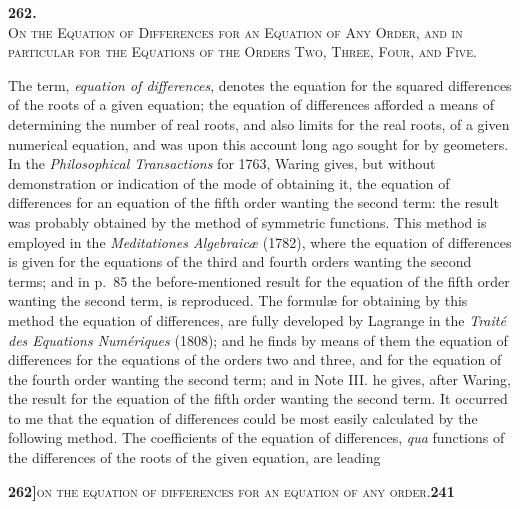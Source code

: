 \documentclass[11pt]{article}
\begin{document}
\vspace{2cm}
\begin{center}
{\large\textbf{262.}}\\[1.5em]
{\large\textsc{On the Equation of Differences for an Equation of Any Order, and in particular for the Equations of the Orders Two, Three, Four, and Five.}}\\[1.5em]
\end{center}

\medskip
{}

\bigskip

\noindent The term, \textit{equation of differences}, denotes the equation for the squared differences of the roots of a given equation; the equation of differences afforded a means of determining the number of real roots, and also limits for the real roots, of a given numerical equation, and was upon this account long ago sought for by geometers. In the \textit{Philosophical Transactions} for 1763, Waring gives, but without demonstration or indication of the mode of obtaining it, the equation of differences for an equation of the fifth order wanting the second term: the result was probably obtained by the method of symmetric functions. This method is employed in the \textit{Meditationes Algebraic\ae} (1782), where the equation of differences is given for the equations of the third and fourth orders wanting the second terms; and in p.~85 the before-mentioned result for the equation of the fifth order wanting the second term, is reproduced. The formul\ae{} for obtaining by this method the equation of differences, are fully developed by Lagrange in the \textit{Trait\'e des Equations Num\'eriques} (1808); and he finds by means of them the equation of differences for the equations of the orders two and three, and for the equation of the fourth order wanting the second term; and in Note III. he gives, after Waring, the result for the equation of the fifth order wanting the second term. It occurred to me that the equation of differences could be most easily calculated by the following method. The coefficients of the equation of differences, \textit{qua} functions of the differences of the roots of the given equation, are leading

\newpage
\noindent\textbf{262]}\hfill\textsc{on the equation of differences for an equation of any order.}\hfill\textbf{241}
\end{document}
